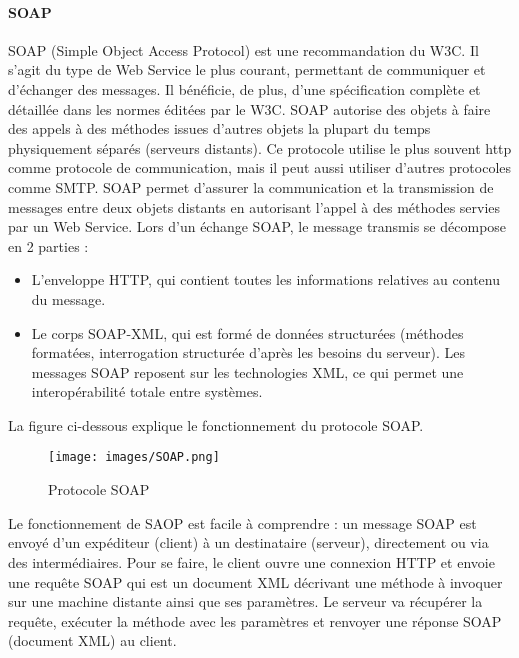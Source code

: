 {\paragraph{SOAP}
SOAP (Simple Object Access Protocol)  est une recommandation du W3C. Il s'agit du type de Web Service le plus courant, permettant de communiquer et d'échanger des messages.
Il bénéficie, de plus, d'une spécification complète et détaillée dans les normes éditées par le W3C.
SOAP autorise des objets à faire des appels à des méthodes issues d'autres objets la plupart du temps physiquement séparés (serveurs distants). Ce protocole utilise le plus souvent http comme protocole de communication, mais il peut aussi utiliser d'autres protocoles comme
SMTP. SOAP permet d'assurer la communication et la transmission de messages entre deux objets distants en autorisant l'appel à des méthodes servies par un Web Service. Lors d'un échange SOAP, le message transmis se décompose en 2 parties :\\
\begin{itemize}
\item  L'enveloppe HTTP, qui contient toutes les informations relatives au contenu du message.
\item Le corps SOAP-XML, qui est formé de données structurées (méthodes formatées, interrogation structurée d'après les besoins du serveur). Les messages SOAP reposent sur les technologies XML, ce qui permet une interopérabilité totale entre systèmes.
\end{itemize}

La figure ci-dessous explique le fonctionnement du protocole SOAP.
\begin{figure}[H]
\centering
\texttt{[image: images/SOAP.png]}
\caption{Protocole SOAP \cite{soapg}}
\end{figure}

Le fonctionnement de SAOP est facile à comprendre : un message SOAP est envoyé d'un expéditeur (client) à un destinataire (serveur), directement ou via des intermédiaires. Pour se faire, le client ouvre une connexion HTTP et envoie une requête SOAP qui est un document XML décrivant une méthode à invoquer sur une machine distante ainsi que ses paramètres.
Le serveur va récupérer la requête, exécuter la méthode avec les paramètres et renvoyer une réponse SOAP (document XML) au client.\cite{soap}


}
